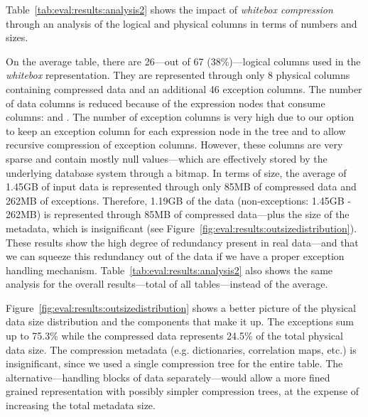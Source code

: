 Table~\ref{tab:eval:results:analysis2} shows the impact of \textit{whitebox compression} through an analysis of the logical and physical columns in terms of numbers and sizes. 



On the average table, there are 26---out of 67 (38\%)---logical columns used in the \textit{whitebox} representation. They are represented through only 8 physical columns containing compressed data and an additional 46 exception columns. The number of data columns is reduced because of the expression nodes that consume columns:  and . The number of exception columns is very high due to our option to keep an exception column for each expression node in the tree and to allow recursive compression of exception columns. However, these columns are very sparse and contain mostly null values---which are effectively stored by the underlying database system through a bitmap. In terms of size, the average of 1.45GB of input data is represented through only 85MB of compressed data and 262MB of exceptions. Therefore, 1.19GB of the data (non-exceptions: 1.45GB - 262MB) is represented through 85MB of compressed data---plus the size of the metadata, which is insignificant (see Figure~\ref{fig:eval:results:outsizedistribution}). These results show the high degree of redundancy present in real data---and that we can squeeze this redundancy out of the data if we have a proper exception handling mechanism.
Table~\ref{tab:eval:results:analysis2} also shows the same analysis for the overall results---total of all tables---instead of the average.

Figure~\ref{fig:eval:results:outsizedistribution} shows a better picture of the physical data size distribution and the components that make it up. The exceptions sum up to 75.3\% while the compressed data represents 24.5\% of the total physical data size. The compression metadata (e.g. dictionaries, correlation maps, etc.) is insignificant, since we used a single compression tree for the entire table. The alternative---handling blocks of data separately---would allow a more fined grained representation with possibly simpler compression trees, at the expense of increasing the total metadata size.

